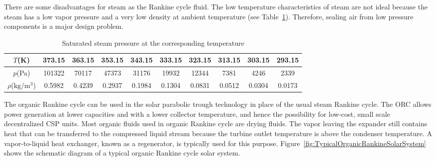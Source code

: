 There are some disadvantages for steam as the Rankine cycle fluid. The low temperature characteristics of steam are not ideal because the steam has a low vapor pressure and a very low density at ambient temperature (see Table~\ref{tab:waterT_P_D}). Therefore, sealing air from low pressure components is a major design problem.
\begin{table}[htbp]
	\caption{Saturated steam pressure at the corresponding temperature}
	\begin{center}
	\begin{tabular}{cccccccccc}
		\toprule	
		    $T$(K)    &	373.15	    &    363.15    &    353.15    &    343.15    &    333.15    &    323.15    &    313.15    &    303.15    &    293.15\\
		\midrule	
		    $p$(Pa)    &    101322        &    70117    &    47373    &    31176    &    19932    &    12344    &    7381    &    4246    &    2339\\
		    $\rho$($\mathrm{kg/m^3}$)    &    0.5982        &    0.4239    &    0.2937    &    0.1984    &    0.1304    &    0.0831    &    0.0512    &    0.0304    &    0.0173\\
		\bottomrule
	\end{tabular}
	\end{center}
	\label{tab:waterT_P_D}
\end{table}

The organic Rankine cycle can be used in the solar parabolic trough technology in place of the usual steam Rankine cycle. The ORC allows power generation at lower capacities and with a lower collector temperature, and hence the possibility for low-cost, small scale decentralized CSP units. Most organic fluids used in organic Rankine cycle are drying fluids. The vapor leaving the expander still contains heat that can be transferred to the compressed liquid stream because the turbine outlet temperature is above the condenser temperature. A vapor-to-liquid heat exchanger, known as a regenerator, is typically used for this purpose.
Figure~\ref{fig:TypicalOrganicRankineSolarSystem} shows the schematic diagram of a typical organic Rankine cycle solar system. 


